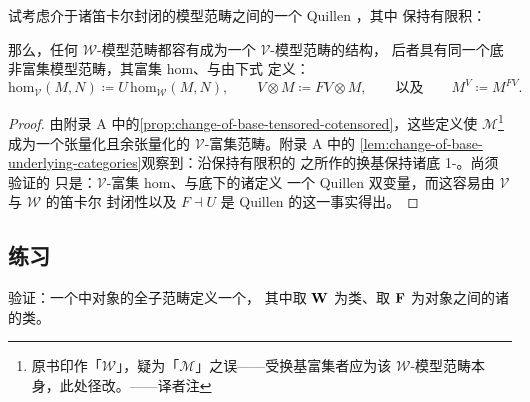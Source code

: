 \begin{theorem}\label{thm:change-of-base-quillen-model}
试考虑介于诸笛卡尔封闭的模型范畴之间的一个 Quillen \trAdjunction，其中%
\trLeftAdjoint{}保持有限积：
\begin{center}
\end{center}
那么，任何 $\mathcal{W}$-模型范畴都容有成为一个 $\mathcal{V}$-模型范畴的结构，
后者具有同一个底非富集模型范畴，其富集 hom、\trCotensor{}与\trTensor{}由下式
定义：
\[ \mathrm{hom}_{\mathcal{V}}(M,N)\coloneqq U\,\mathrm{hom}_{\mathcal{W}}(M,N),
   \qquad
   V\otimes M\coloneqq FV\otimes M,\qquad\text{以及}\qquad
   M^{V}\coloneqq M^{FV}. \]
\end{theorem}
\begin{proof}
由附录 A 中的\cref{prop:change-of-base-tensored-cotensored}，这些定义使
$\mathcal{M}$\footnote{原书印作「$\mathcal{W}$」，疑为「$\mathcal{M}$」之误——受换基富集者应为该 $\mathcal{W}$-模型范畴本身，此处径改。——译者注}成为一个张量化且余张量化的 $\mathcal{V}$-富集范畴。附录 A 中的%
\cref{lem:change-of-base-underlying-categories}观察到：沿保持有限积的%
\trAdjunction{}之\trRightAdjoint{}所作的换基保持诸底 1-\trCategory。尚须验证的
只是：$\mathcal{V}$-富集 hom、\trTensor{}与\trCotensor{}底下的诸\trFunctor{}定义
一个 Quillen
双变量\trAdjunction，而这容易由\trModelCategory{} $\mathcal{V}$ 与 $\mathcal{W}$ 的笛卡尔
封闭性以及 $F\dashv U$ 是 Quillen 的这一事实得出。
\end{proof}

\subsection*{练习}

\begin{exercise}\label{ex:fibrant-objects-from-model}
验证：一个\trModelCategory{}中\trFibrant{}对象的全子范畴定义一个\trCategoryOfFibrantObjects，
其中取 $\mathbf{W}$ 为\trWeakEquivalence{}类、取 $\mathbf{F}$ 为\trFibrant{}对象之间的诸%
\trFibration{}的类。
\end{exercise}

